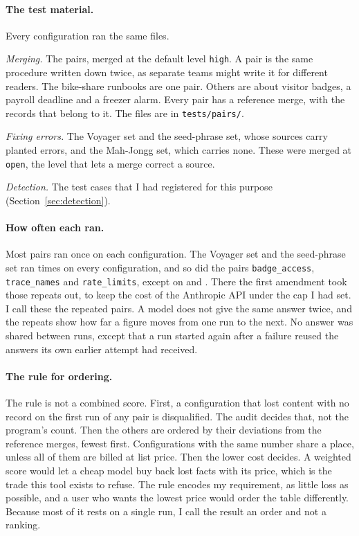 \paragraph{The test material.} Every configuration ran the same files.
\begin{points}
\item \emph{Merging.} The  pairs, merged at the default level \texttt{high}. A pair is the same procedure written down twice, as separate teams might write it for different readers. The bike-share runbooks are one pair. Others are about visitor badges, a payroll deadline and a freezer alarm. Every pair has a reference merge, with the records that belong to it. The files are in \texttt{tests/pairs/}.
\item \emph{Fixing errors.} The Voyager set and the seed-phrase set, whose sources carry planted errors, and the Mah-Jongg set, which carries none. These were merged at \texttt{open}, the level that lets a merge correct a source.
\item \emph{Detection.} The  test cases that I had registered for this purpose (Section~\ref{sec:detection}).
\end{points}

\paragraph{How often each ran.} Most pairs ran once on each configuration. The Voyager set and the seed-phrase set ran  times on every configuration, and so did the pairs \texttt{badge\_access}, \texttt{trace\_names} and \texttt{rate\_limits}, except on \texttt{} and \texttt{}. There the first amendment took those repeats out, to keep the cost of the Anthropic API under the cap I had set. I call these the repeated pairs. A model does not give the same answer twice, and the repeats show how far a figure moves from one run to the next. No answer was shared between runs, except that a run started again after a failure reused the answers its own earlier attempt had received.

\paragraph{The rule for ordering.} The rule is not a combined score. First, a configuration that lost content with no record on the first run of any pair is disqualified. The audit decides that, not the program's count. Then the others are ordered by their deviations from the reference merges, fewest first. Configurations with the same number share a place, unless all of them are billed at list price. Then the lower cost decides. A weighted score would let a cheap model buy back lost facts with its price, which is the trade this tool exists to refuse. The rule encodes my requirement, as little loss as possible, and a user who wants the lowest price would order the table differently. Because most of it rests on a single run, I call the result an order and not a ranking.

